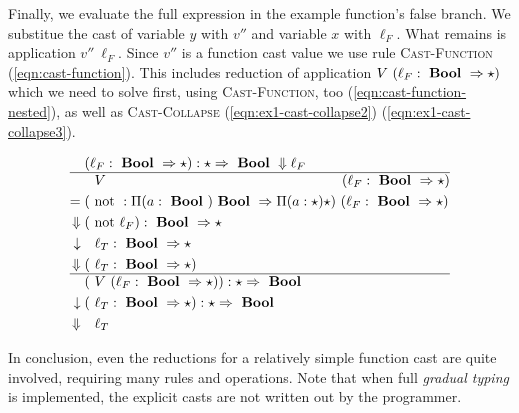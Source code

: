 Finally, we evaluate the full expression in the example function's false branch. We substitue the cast of variable $y$ with $v''$ and variable $x$ with $\ell_F$. What remains is application $v''~\ell_F$. Since $v''$ is a function cast value we use rule \textsc{Cast-Function} (\ref{eqn:cast-function}). This includes reduction of application $V~(\ell_F : \text{ \textbf{Bool} } \Rightarrow \star)$ which we need to solve first, using \textsc{Cast-Function}, too (\ref{eqn:cast-function-nested}), as well as \textsc{Cast-Collapse} (\ref{eqn:ex1-cast-collapse2}) (\ref{eqn:ex1-cast-collapse3}).

\begin{align}
(&\ell_F : \Bool \Rightarrow \star) : \star \Rightarrow \Bool \Downarrow \ell_F \label{eqn:ex1-cast-collapse2} \\ \hline
&~V~ \hspace{16.6em} (\ell_F : \Bool \Rightarrow \star) \\
= ( &\notf : \Pi(a:\Bool) \Bool \Rightarrow \Pi(a:\star) \star)~(\ell_F : \Bool \Rightarrow \star) \\
\Downarrow ( &\notf \ell_F ) : \Bool \Rightarrow \star \\
\downarrow ~~&~\ell_T : \Bool \Rightarrow \star \label{eqn:cast-function-nested} \\
\Downarrow (&~\ell_T : \Bool \Rightarrow \star) \\ \hline
( & ~V~(\ell_F : \Bool \Rightarrow \star)) : \star \Rightarrow \Bool \\
\downarrow (&~\ell_T : \Bool \Rightarrow \star) : \star \Rightarrow \Bool \label{eqn:cast-function} \\
\Downarrow ~~ & ~\ell_T \label{eqn:ex1-cast-collapse3}
\end{align}

In conclusion, even the reductions for a relatively simple function cast are quite involved, requiring many rules and operations. Note that when full \emph{gradual typing} is implemented, the explicit casts are not written out by the programmer.
